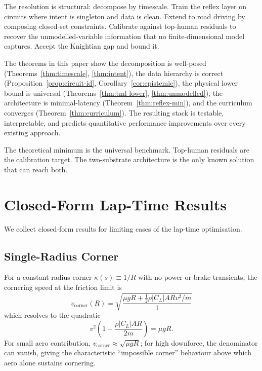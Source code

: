 \documentclass[11pt,twocolumn]{article}
\theoremstyle{definition}
\theoremstyle{remark}
\begin{document}
The resolution is structural: decompose by timescale. Train the reflex layer on circuits where intent is singleton and data is clean. Extend to road driving by composing closed-set constraints. Calibrate against top-human residuals to recover the unmodelled-variable information that no finite-dimensional model captures. Accept the Knightian gap and bound it.

The theorems in this paper show the decomposition is well-posed (Theorems~\ref{thm:timescale}, \ref{thm:intent}), the data hierarchy is correct (Proposition~\ref{prop:circuit-id}, Corollary~\ref{cor:epistemic}), the physical lower bound is universal (Theorems~\ref{thm:tml-lower}, \ref{thm:unmodelled}), the architecture is minimal-latency (Theorem~\ref{thm:reflex-min}), and the curriculum converges (Theorem~\ref{thm:curriculum}). The resulting stack is testable, interpretable, and predicts quantitative performance improvements over every existing approach.

The theoretical minimum is the universal benchmark. Top-human residuals are the calibration target. The two-substrate architecture is the only known solution that can reach both.

\appendix

\section{Closed-Form Lap-Time Results}
\label{app:closedform}

We collect closed-form results for limiting cases of the lap-time optimisation.

\subsection{Single-Radius Corner}

For a constant-radius corner $\kappa(s) \equiv 1/R$ with no power or brake transients, the cornering speed at the friction limit is
\begin{equation}
v_{\mathrm{corner}}(R) = \sqrt{\frac{\mu g R + \tfrac{1}{2}\rho |C_L| A R v^2 / m}{1}}
\end{equation}
which resolves to the quadratic
\begin{equation}
v^2 \left(1 - \frac{\rho |C_L| A R}{2m}\right) = \mu g R.
\end{equation}
For small aero contribution, $v_{\mathrm{corner}} \approx \sqrt{\mu g R}$; for high downforce, the denominator can vanish, giving the characteristic ``impossible corner'' behaviour above which aero alone sustains cornering.
\end{document}
